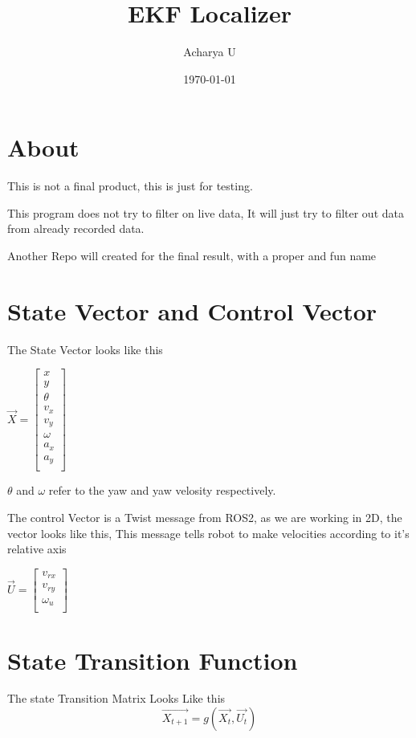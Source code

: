 \documentclass[11pt]{article}
\author{Acharya U}
\date{\today}
\title{EKF Localizer}
\begin{document}
\maketitle
\tableofcontents


\section{About}
\label{sec:orga322f25}
This is not a final product, this is just for testing.

This program does not try to filter on live data, It will just try to filter out data from already recorded data. 

Another Repo will created for the final result, with a proper and fun name

\section{State Vector and Control Vector}
\label{sec:orgd80469c}
The State Vector  looks like this

\begin{math}
\vec{X} = 
\begin{bmatrix}
x \\
y \\
\theta \\
v_x \\
v_y \\
\omega \\
a_x \\
a_y \\
\end{bmatrix}
\end{math}

\(\theta\) and \(\omega\) refer to the yaw and yaw velosity respectively.

The control Vector is a Twist message from ROS2, as we are working in 2D, the vector looks like this, This message tells robot to make velocities according to it's relative axis

\begin{math}
\vec{U} =
\begin{bmatrix}
v_{rx} \\
v_{ry} \\
\omega_u \\
\end{bmatrix}
\end{math}



\section{State Transition Function}
\label{sec:orgac6f54d}
The state Transition Matrix Looks Like this
\[  \vec{X_{t+1}} = g\left( \vec{X_t}, \vec{U_t} \right )  \]
\end{document}
